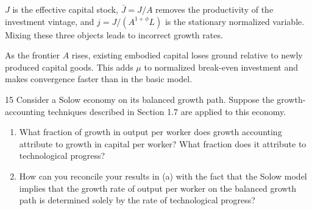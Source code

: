 \begin{note}[Notation]
    \(J\) is the effective capital stock, \(\bar J=J/A\) removes the
    productivity of the investment vintage, and
    \(j=J/(A^{1+\phi}L)\) is the stationary normalized variable. Mixing these
    three objects leads to incorrect growth rates.
\end{note}

\begin{note}
    As the frontier \(A\) rises, existing embodied capital loses ground
    relative to newly produced capital goods. This adds \(\mu\) to normalized
    break-even investment and makes convergence faster than in the basic model.
\end{note}

\begin{problem}{15}
Consider a Solow economy on its balanced growth path. Suppose the growth-accounting techniques
described in Section 1.7 are applied to this economy.
\begin{enumerate}[label=(\alph*)]
    \item What fraction of growth in output per worker does growth accounting attribute to growth
    in capital per worker? What fraction does it attribute to technological progress?
    \item How can you reconcile your results in (a) with the fact that the Solow model implies that
    the growth rate of output per worker on the balanced growth path is determined solely by the rate
    of technological progress?
\end{enumerate}
\end{problem}

